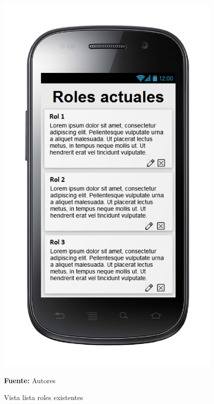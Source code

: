 \begin{figure}[!htb]
  \begin{center}
\includegraphics[width=11cm]{./imagenes/UI/Administracion/lista_roles_existentes.png}
    \caption{Vista lista roles existentes}
    \label{fig:Vista_lista_roles_existentes}
    \textbf{Fuente:}  Autores
  \end{center}
\end{figure}
